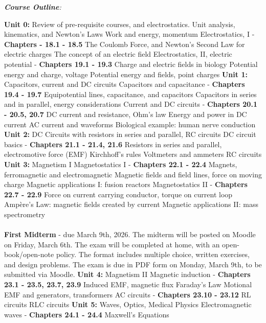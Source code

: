 \documentclass[10pt]{article}
\begin{document}
\twocolumn
\textit{\textbf{Course Outline}:}
\begin{outline}[enumerate]
\1 \textbf{Unit 0:} Review of pre-requisite courses, and electrostatics.
\2 Unit analysis, kinematics, and Newton's Laws
\2 Work and energy, momentum
\2 Electrostatics, I - \textbf{Chapters - 18.1 - 18.5}
\3 The Coulomb Force, and Newton's Second Law for electric charges
\3 The concept of an electric field
\2 Electrostatics, II, electric potential - \textbf{Chapters 19.1 - 19.3}
\3 Charge and electric fields in biology
\3 Potential energy and charge, voltage
\3 Potential energy and fields, point charges
\1 \textbf{Unit 1:} Capacitors, current and DC circuits
\2 Capacitors and capacitance - \textbf{Chapters 19.4 - 19.7}
\3 Equipotential lines, capacitance, and capacitors
\3 Capacitors in series and in parallel, energy considerations
\2 Current and DC circuits - \textbf{Chapters 20.1 - 20.5, 20.7}
\3 DC current and resistance, Ohm's law
\3 Energy and power in DC current
\3 AC current and waveforms
\3 Biological example: human nerve conduction
\1 \textbf{Unit 2:} DC Circuits with resistors in series and parallel, RC circuits
\2 DC circuit basics - \textbf{Chapters 21.1 - 21.4, 21.6}
\3 Resistors in series and parallel, electromotive force (EMF)
\3 Kirchhoff's rules
\3 Voltmeters and ammeters
\3 RC circuits
\1 \textbf{Unit 3:} Magnetism I
\2 Magnetostatics I - \textbf{Chapters 22.1 - 22.4}
\3 Magnets, ferromagnetic and electromagnetic
\3 Magnetic fields and field lines, force on moving charge
\3 Magnetic applications I: fusion reactors
\2 Magnetostatics II - \textbf{Chapters 22.7 - 22.9}
\3 Force on current carrying conductor, torque on current loop
\3 Amp\`{e}re's Law: magnetic fields created by current
\3 Magnetic applications II: mass spectrometry \\ \\
\1 \textbf{First Midterm} - due March 9th, 2026.
\2 The midterm will be posted on Moodle on Friday, March 6th.
\2 The exam will be completed at home, with an open-book/open-note policy.  The format includes multiple choice, written exercises, and design problems.
\2 The exam is due in PDF form on Monday, March 9th, to be submitted via Moodle.
\1 \textbf{Unit 4:} Magnetism II
\2 Magnetic induction - \textbf{Chapters 23.1 - 23.5, 23.7, 23.9}
\3 Induced EMF, magnetic flux
\3 Faraday's Law
\3 Motional EMF and generators, transformers
\2 AC circuits - \textbf{Chapters 23.10 - 23.12}
\3 RL circuits
\3 RLC circuits
\1 \textbf{Unit 5:} Waves, Optics, Medical Physics
\2 Electromagnetic waves - \textbf{Chapters 24.1 - 24.4}
\3 Maxwell's Equations

\end{outline}
\end{document}
